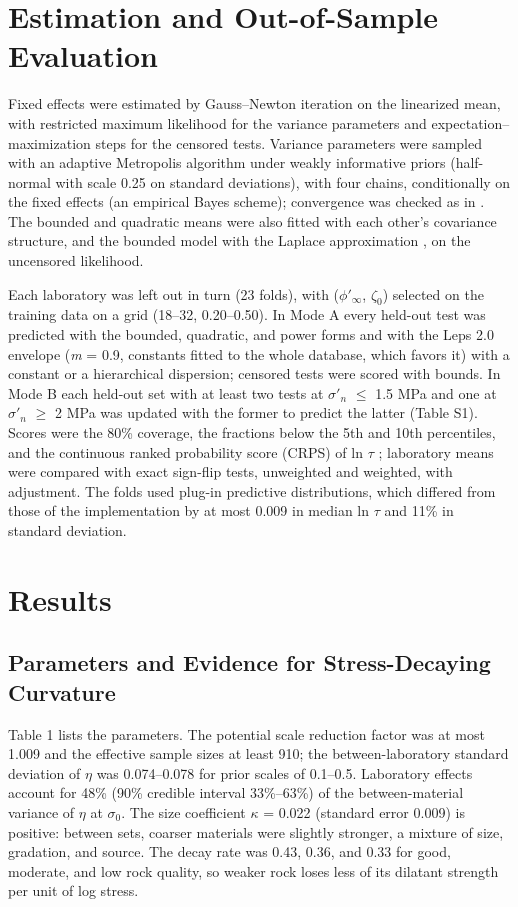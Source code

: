\documentclass[Journal,letterpaper]{ascelike-new}
\begin{document}
\section{Estimation and Out-of-Sample Evaluation}
Fixed effects were estimated by Gauss--Newton iteration on the linearized mean, with restricted maximum likelihood for the variance parameters and expectation--maximization steps for the censored tests. Variance parameters were sampled with an adaptive Metropolis algorithm under weakly informative priors (half-normal with scale 0.25 on standard deviations), with four chains, conditionally on the fixed effects (an empirical Bayes scheme); convergence was checked as in . The bounded and quadratic means were also fitted with each other's covariance structure, and the bounded model with the Laplace approximation \cite{pinheiro2000}, on the uncensored likelihood.

Each laboratory was left out in turn (23 folds), with ($\phi'_\infty$, $\zeta_0$) selected on the training data on a grid (18--32\textdegree{}, 0.20--0.50). In Mode A every held-out test was predicted with the bounded, quadratic, and power forms and with the Leps 2.0 envelope (\textit{m} = 0.9, constants fitted to the whole database, which favors it) with a constant or a hierarchical dispersion; censored tests were scored with bounds. In Mode B each held-out set with at least two tests at $\sigma'_n$ $\le$ 1.5 MPa and one at $\sigma'_n$ $\ge$ 2 MPa was updated with the former to predict the latter (Table S1). Scores were the 80\% coverage, the fractions below the 5th and 10th percentiles, and the continuous ranked probability score (CRPS) of ln $\tau$ \cite{gneiting2007}; laboratory means were compared with exact sign-flip tests, unweighted and weighted, with  adjustment. The folds used plug-in predictive distributions, which differed from those of the implementation by at most 0.009 in median ln $\tau$ and 11\% in standard deviation.

\section{Results}
\subsection{Parameters and Evidence for Stress-Decaying Curvature}
Table 1 lists the parameters. The potential scale reduction factor was at most 1.009 and the effective sample sizes at least 910; the between-laboratory standard deviation of $\eta$ was 0.074--0.078 for prior scales of 0.1--0.5. Laboratory effects account for 48\% (90\% credible interval 33\%--63\%) of the between-material variance of $\eta$ at $\sigma_0$. The size coefficient $\kappa$ = 0.022 (standard error 0.009) is positive: between sets, coarser materials were slightly stronger, a mixture of size, gradation, and source. The decay rate was 0.43, 0.36, and 0.33 for good, moderate, and low rock quality, so weaker rock loses less of its dilatant strength per unit of log stress.
\end{document}
